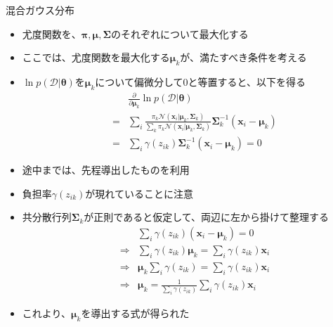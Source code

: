 \documentclass[dvipdfmx,notheorems,t]{beamer}
\begin{document}
\begin{frame}{混合ガウス分布}
\begin{itemize}
\begin{itemize}
		\item 尤度関数を、$\bm{\pi}, \bm{\mu}, \bm{\Sigma}$のそれぞれについて最大化する
		\item ここでは、尤度関数を最大化する$\bm{\mu}_k$が、満たすべき条件を考える
		\item $\ln p(\mathcal{D} | \bm{\theta})$を$\bm{\mu}_k$について偏微分して$0$と等置すると、以下を得る
		\begin{eqnarray}
			&& \frac{\partial}{\partial \bm{\mu}_k} \ln p(\mathcal{D} | \bm{\theta}) \nonumber \\
			&=& \sum_i \frac{\pi_k \mathcal{N}(\bm{x}_i | \bm{\mu}_k, \bm{\Sigma}_k)}{\sum_k \pi_k \mathcal{N}(\bm{x}_i | \bm{\mu}_k, \bm{\Sigma}_k)} \bm{\Sigma}_k^{-1} (\bm{x}_i - \bm{\mu}_k) \\
			&=& \sum_i \gamma(z_{ik}) \bm{\Sigma}_k^{-1} (\bm{x}_i - \bm{\mu}_k) = 0
		\end{eqnarray}
		\item 途中までは、先程導出したものを利用
		\item 負担率$\gamma(z_{ik})$が現れていることに注意
		\newline
		\item 共分散行列$\bm{\Sigma}_k$が正則であると仮定して、両辺に左から掛けて整理する
		\begin{eqnarray}
			&& \sum_i \gamma(z_{ik}) (\bm{x}_i - \bm{\mu}_k) = 0 \nonumber \\
			&\Rightarrow& \sum_i \gamma(z_{ik}) \bm{\mu}_k = \sum_i \gamma(z_{ik}) \bm{x}_i \nonumber \\
			&\Rightarrow& \bm{\mu}_k \sum_i \gamma(z_{ik}) = \sum_i \gamma(z_{ik}) \bm{x}_i \nonumber \\
			&\Rightarrow& \bm{\mu}_k = \frac{1}{\sum_i \gamma(z_{ik})} \sum_i \gamma(z_{ik}) \bm{x}_i
		\end{eqnarray}
		\item これより、$\bm{\mu}_k$を導出する式が得られた
	\end{itemize}
\end{itemize}

\end{frame}
\end{document}
